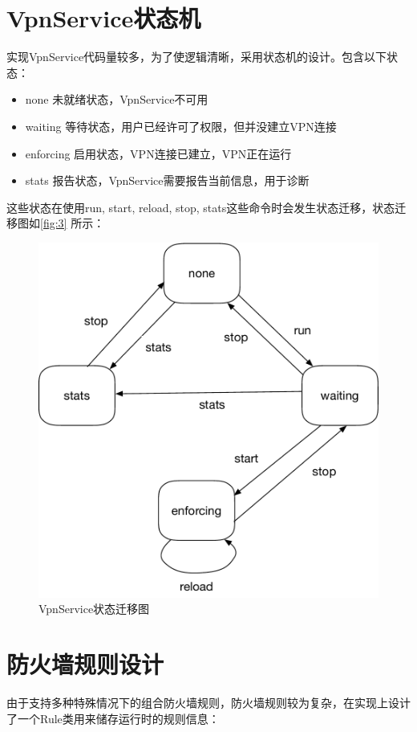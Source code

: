 \documentclass[format=final, language=chinese, degree=fyp]{hustthesis}
\begin{document}
\section{VpnService状态机}

实现VpnService代码量较多，为了使逻辑清晰，采用状态机的设计。包含以下状态：
\begin{itemize}
    \item none          未就绪状态，VpnService不可用
    \item waiting       等待状态，用户已经许可了权限，但并没建立VPN连接
    \item enforcing     启用状态，VPN连接已建立，VPN正在运行
    \item stats         报告状态，VpnService需要报告当前信息，用于诊断
\end{itemize}

这些状态在使用run, start, reload, stop, stats这些命令时会发生状态迁移，状态迁移图如\autoref{fig:3} 所示：

\begin{figure}[h!]
\centering
\includegraphics[width=.6\textwidth]{state_machine}
\caption{VpnService状态迁移图}\label{fig:3}
\end{figure}


\section{防火墙规则设计}

由于支持多种特殊情况下的组合防火墙规则，防火墙规则较为复杂，在实现上设计了一个Rule类用来储存运行时的规则信息：
\end{document}
